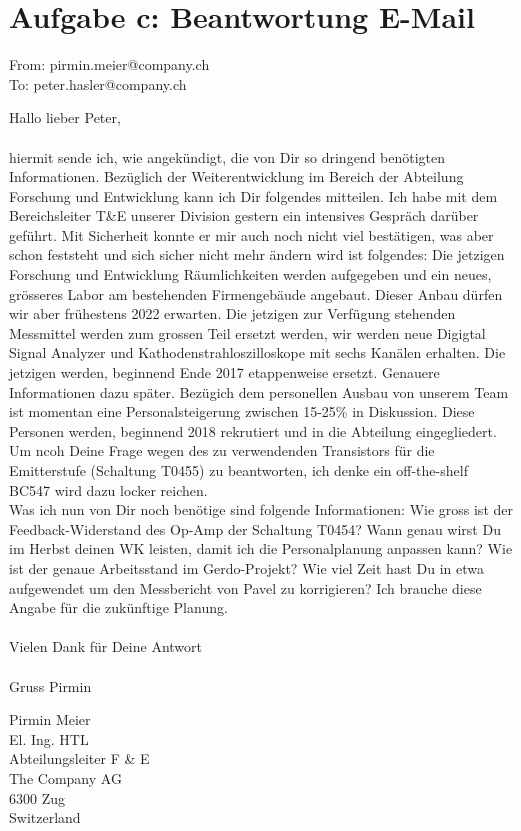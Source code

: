 \newpage
\section*{Aufgabe c: Beantwortung E-Mail}
From: pirmin.meier@company.ch\\
To: peter.hasler@company.ch

Hallo lieber Peter,\\\\
hiermit sende ich, wie angekündigt, die von Dir so dringend benötigten Informationen. 
Bezüglich der Weiterentwicklung im Bereich der Abteilung Forschung und Entwicklung kann ich Dir folgendes mitteilen. Ich habe mit dem Bereichsleiter T\&E unserer Division gestern ein intensives Gespräch darüber geführt. Mit Sicherheit konnte er mir auch noch nicht viel bestätigen, was aber schon feststeht und sich sicher nicht mehr ändern wird ist folgendes: Die jetzigen Forschung und Entwicklung Räumlichkeiten werden aufgegeben und ein neues, grösseres Labor am bestehenden Firmengebäude angebaut. Dieser Anbau dürfen wir aber frühestens 2022 erwarten. Die jetzigen zur Verfügung stehenden Messmittel werden zum grossen Teil ersetzt werden, wir werden neue Digigtal Signal Analyzer und Kathodenstrahloszilloskope mit sechs Kanälen erhalten. Die jetzigen werden, beginnend Ende 2017 etappenweise ersetzt. Genauere Informationen dazu später. Bezügich dem personellen Ausbau von unserem Team ist momentan eine Personalsteigerung zwischen 15-25\% in Diskussion. Diese Personen werden, beginnend 2018 rekrutiert und in die Abteilung eingegliedert.
Um ncoh Deine Frage wegen des zu verwendenden Transistors für die Emitterstufe (Schaltung T0455) zu beantworten, ich denke ein off-the-shelf BC547 wird dazu locker reichen. \\
Was ich nun von Dir noch benötige sind folgende Informationen:
Wie gross ist der Feedback-Widerstand des Op-Amp der Schaltung T0454?
Wann genau wirst Du im Herbst deinen WK leisten, damit ich die Personalplanung anpassen kann?
Wie ist der genaue Arbeitsstand im Gerdo-Projekt?
Wie viel Zeit hast Du in etwa aufgewendet um den Messbericht von Pavel zu korrigieren? Ich brauche diese Angabe für die zukünftige Planung.\\\\
Vielen Dank für Deine Antwort\\\\
Gruss Pirmin

Pirmin Meier\\
El. Ing. HTL\\
Abteilungsleiter F \& E\\
The Company AG\\
6300 Zug\\
Switzerland
   